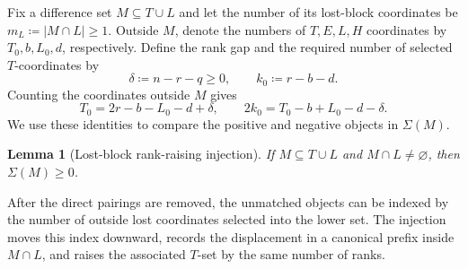 \documentclass[11pt]{article}
\newtheorem{lemma}[theorem]{Lemma}
\begin{document}
Fix a difference set ${M\subseteq T\cup L}$ and let the number of its lost-block coordinates be ${m_L\coloneqq|M\cap L|\geq1}$.
Outside $M$, denote the numbers of $T,E,L,H$ coordinates by $T_0,b,L_0,d$, respectively.
Define the rank gap and the required number of selected $T$-coordinates by
\begin{equation*}
\delta\coloneqq n-r-q\geq0,
\qquad
k_0\coloneqq r-b-d.
\end{equation*}
Counting the coordinates outside $M$ gives
\begin{equation}
T_0=2r-b-L_0-d+\delta,
\qquad
2k_0=T_0-b+L_0-d-\delta.
\label{eq:lost-identities-alt}
\end{equation}
We use these identities to compare the positive and negative objects in $\Sigma(M)$.

\begin{lemma}[Lost-block rank-raising injection]\label{lem:lost-injection}
If ${M\subseteq T\cup L}$ and ${M\cap L\neq\varnothing}$, then ${\Sigma(M)\geq0}$.
\end{lemma}

After the direct pairings are removed, the unmatched objects can be indexed by the number of outside lost coordinates selected into the lower set.
The injection moves this index downward, records the displacement in a canonical prefix inside $M\cap L$, and raises the associated $T$-set by the same number of ranks.
\end{document}

